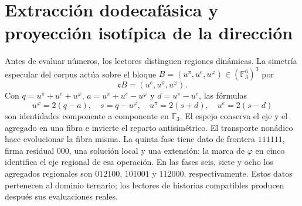 \documentclass[a4paper,10pt]{article}
\theoremstyle{definition}\newtheorem{definition}[theorem]{Definición}
\theoremstyle{remark}\newtheorem{remark}[theorem]{Observación}
\numberwithin{equation}{section}
\begin{document}



\section{Extracción dodecafásica y proyección isotípica de la dirección}
\label{sec:register}
Antes de evaluar números, los lectores distinguen regiones dinámicas.
La simetría especular del corpus actúa sobre el bloque
\(B=(u^\pi,u^e,u^\varphi)\in(\mathbb F_3^6)^3\) por
\[
 \mathfrak cB=(u^e,u^\pi,u^\varphi).
\]
Con \(q=u^\pi+u^e+u^\varphi\),
\(a=u^\pi+u^e-u^\varphi\) y \(d=u^\pi-u^e\), las fórmulas
\[
 u^\varphi=2(q-a),\quad s=q-u^\varphi,\quad
 u^\pi=2(s+d),\quad u^e=2(s-d)
\]
son identidades componente a componente en \(\mathbb F_3\). El espejo
conserva el eje y el agregado en una fibra e invierte el reparto
antisimétrico. El transporte nonádico hace evolucionar la fibra misma.
La quinta fase tiene dato de frontera \(111111\), firma residual
\(000\), una solución local y una extensión: la marca de
\(\varphi\) en cinco identifica el eje regional de esa operación.
En las fases seis, siete y ocho los agregados regionales son
\(012100\), \(101001\) y \(112000\), respectivamente. Estos datos
pertenecen al dominio ternario; los lectores de historias compatibles
producen después sus evaluaciones reales.
\end{document}
